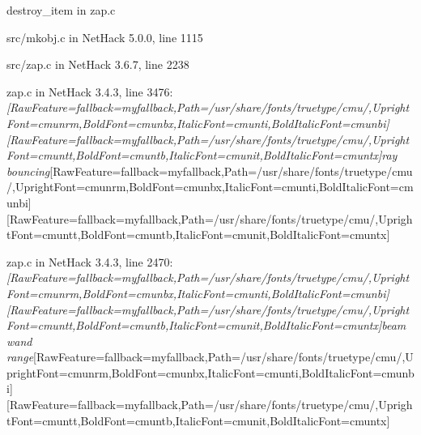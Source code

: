 \begin{myenumerate}
\item{} destroy\_item\footnotemark[199] in zap.c\footnotemark[200]

\item{} src/mkobj.c in NetHack 5.0.0, line 1115\footnotemark[201]
     

\item{} src/zap.c in NetHack 3.6.7, line 2238\footnotemark[202]
     

\item{} zap.c in NetHack 3.4.3, line 3476\footnotemark[203]: {\itshape \allowbreak{}\setmainfont{cmunti.ttf}[RawFeature={fallback=myfallback},Path=/usr/share/fonts/truetype/cmu/,UprightFont=cmunrm,BoldFont=cmunbx,ItalicFont=cmunti,BoldItalicFont=cmunbi]\setmonofont{cmunti.ttf}[RawFeature={fallback=myfallback},Path=/usr/share/fonts/truetype/cmu/,UprightFont=cmuntt,BoldFont=cmuntb,ItalicFont=cmunit,BoldItalicFont=cmuntx]\itshape ray bouncing}\allowbreak{}\setmainfont{cmunrm.ttf}[RawFeature={fallback=myfallback},Path=/usr/share/fonts/truetype/cmu/,UprightFont=cmunrm,BoldFont=cmunbx,ItalicFont=cmunti,BoldItalicFont=cmunbi]\setmonofont{cmunrm.ttf}[RawFeature={fallback=myfallback},Path=/usr/share/fonts/truetype/cmu/,UprightFont=cmuntt,BoldFont=cmuntb,ItalicFont=cmunit,BoldItalicFont=cmuntx]
     

\item{} zap.c in NetHack 3.4.3, line 2470\footnotemark[204]: {\itshape \allowbreak{}\setmainfont{cmunti.ttf}[RawFeature={fallback=myfallback},Path=/usr/share/fonts/truetype/cmu/,UprightFont=cmunrm,BoldFont=cmunbx,ItalicFont=cmunti,BoldItalicFont=cmunbi]\setmonofont{cmunti.ttf}[RawFeature={fallback=myfallback},Path=/usr/share/fonts/truetype/cmu/,UprightFont=cmuntt,BoldFont=cmuntb,ItalicFont=cmunit,BoldItalicFont=cmuntx]\itshape beam wand range}\allowbreak{}\setmainfont{cmunrm.ttf}[RawFeature={fallback=myfallback},Path=/usr/share/fonts/truetype/cmu/,UprightFont=cmunrm,BoldFont=cmunbx,ItalicFont=cmunti,BoldItalicFont=cmunbi]\setmonofont{cmunrm.ttf}[RawFeature={fallback=myfallback},Path=/usr/share/fonts/truetype/cmu/,UprightFont=cmuntt,BoldFont=cmuntb,ItalicFont=cmunit,BoldItalicFont=cmuntx]
     


\end{myenumerate}
